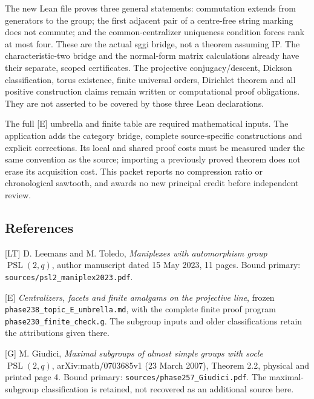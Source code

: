 \documentclass[
  11pt,
]{article}
\begin{document}
The new Lean file proves three general statements: commutation extends
from generators to the group; the first adjacent pair of a centre-free
string marking does not commute; and the common-centralizer uniqueness
condition forces rank at most four. These are the actual sggi bridge,
not a theorem assuming IP. The characteristic-two bridge and the
normal-form matrix calculations already have their separate, scoped
certificates. The projective conjugacy/descent, Dickson classification,
torus existence, finite universal orders, Dirichlet theorem and all
positive construction claims remain written or computational proof
obligations. They are not asserted to be covered by those three Lean
declarations.

The full {[}E{]} umbrella and finite table are required mathematical
inputs. The application adds the category bridge, complete
source-specific constructions and explicit corrections. Its local and
shared proof costs must be measured under the same convention as the
source; importing a previously proved theorem does not erase its
acquisition cost. This packet reports no compression ratio or
chronological sawtooth, and awards no new principal credit before
independent review.

\subsection{References}\label{references}

{[}LT{]} D. Leemans and M. Toledo, \emph{Maniplexes with automorphism
group \(\operatorname{PSL}(2,q)\)}, author manuscript dated 15 May 2023,
11 pages. Bound primary: \texttt{sources/psl2\_maniplex2023.pdf}.

{[}E{]} \emph{Centralizers, facets and finite amalgams on the projective
line}, frozen \texttt{phase238\_topic\_E\_umbrella.md}, with the
complete finite proof program \texttt{phase230\_finite\_check.g}. The
subgroup inputs and older classifications retain the attributions given
there.

{[}G{]} M. Giudici, \emph{Maximal subgroups of almost simple groups with
socle \(\operatorname{PSL}(2,q)\)}, arXiv:math/0703685v1 (23 March
2007), Theorem 2.2, physical and printed page 4. Bound primary:
\texttt{sources/phase257\_Giudici.pdf}. The maximal-subgroup
classification is retained, not recovered as an additional source here.
\end{document}
